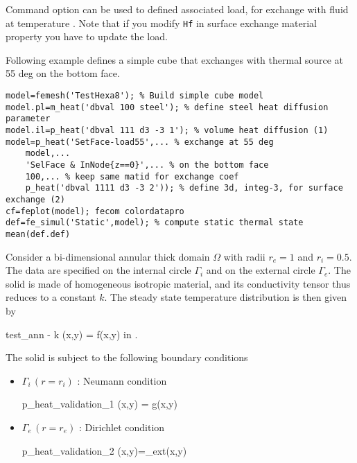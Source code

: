 Command option  can be used to defined associated load, for exchange with fluid at temperature . Note that if you modify {\tt Hf} in surface exchange material property you have to update the load.

Following example defines a simple cube that exchanges with thermal source at 55 deg on the bottom face.

\begin{verbatim} 
model=femesh('TestHexa8'); % Build simple cube model
model.pl=m_heat('dbval 100 steel'); % define steel heat diffusion parameter
model.il=p_heat('dbval 111 d3 -3 1'); % volume heat diffusion (1)
model=p_heat('SetFace-load55',... % exchange at 55 deg
    model,...
    'SelFace & InNode{z==0}',... % on the bottom face
    100,... % keep same matid for exchange coef
    p_heat('dbval 1111 d3 -3 2')); % define 3d, integ-3, for surface exchange (2)
cf=feplot(model); fecom colordatapro
def=fe_simul('Static',model); % compute static thermal state
mean(def.def)
\end{verbatim}%


Consider a bi-dimensional annular thick domain $\Omega$ with radii $r_e=1$ and $r_i=0.5$. The data are specified on the internal circle $\Gamma_i$ and on the external circle $\Gamma_e$. The solid is made of homogeneous isotropic material, and its conductivity tensor thus reduces to a constant $k$. The steady state temperature distribution is then given by
\begin{eqsvg}{test_ann}
- k \Delta\theta(x,y) = f(x,y) \quad in \quad \Omega.
\end{eqsvg}

The solid is subject to the following boundary conditions\\
\begin{itemize}
\item{ {$\Gamma_i \,(r=r_i)$ : Neumann condition}\\
\begin{eqsvg}{p_heat_validation_1}
\displaystyle{}(x,y) = g(x,y)
\end{eqsvg}  }
\item{ {$\Gamma_e \,(r=r_e)$ : Dirichlet condition}\\
\begin{eqsvg}{p_heat_validation_2}
\theta(x,y)=\theta_{ext}(x,y)
\end{eqsvg}  }
\end{itemize}

